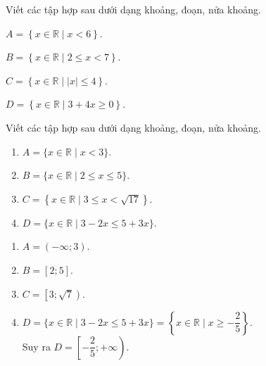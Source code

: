 \begin{bt}[1,0 điểm]%
	Viết các tập hợp sau dưới dạng khoảng, đoạn, nửa khoảng.
	\begin{listEX}[2]
		\item $A = \left\lbrace x \in \mathbb{R} \mid x < 6\right\rbrace$.
		\item $B = \left\lbrace x \in \mathbb{R}\mid 2 \leq x < 7\right\rbrace$.
		\item $C = \left\lbrace x \in \mathbb{R} \mid |x| \leq 4\right\rbrace$.
		\item $D = \left\lbrace x \in \mathbb{R} \mid 3 + 4x \geq 0 \right\rbrace$.
	\end{listEX}
	\loigiai{
		\begin{enumerate}
			\item $A = \left\lbrace x \in \mathbb{R} \mid x < 6\right\rbrace = (-\infty;6)$.
			\item $B = \left\lbrace x \in \mathbb{R}\mid 2 \leq x < 7\right\rbrace = [2;7)$.
			\item Ta có $|x| \leq 4 \Rightarrow -4 \leq x \leq 4$\\
			$\Rightarrow C = \left\lbrace x \in \mathbb{R} \mid |x| \leq 4\right\rbrace = [-4;4]$.
			\item Ta có $3 + 4x \geq 0 \Rightarrow x \geq -\dfrac{3}{4}$\\
			$\Rightarrow D = \left\lbrace x \in \mathbb{R} \mid 3 + 4x \geq 0 \right\rbrace = \left[-\dfrac{3}{4};+\infty\right)$.
		\end{enumerate}
	}
\end{bt}

\begin{bt}%
    Viết các tập hợp sau dưới dạng khoảng, đoạn, nửa khoảng.
    \begin{enumerate}
        \item $A=\{x \in \mathbb{R} \mid x<3\}$.
        \item $B=\{x \in \mathbb{R} \mid 2 \leq x \leq 5\}$.
        \item $C=\left\{x \in \mathbb{R} \mid 3 \leq x<\sqrt{17}\right\}$.
        \item $D=\{x \in \mathbb{R} \mid 3-2 x \leq 5+3 x\}$.
    \end{enumerate}
    \loigiai
    {
          \begin{enumerate}
            \item $A=(-\infty;3)$.
            \item $B=[2;5]$.
            \item $C=\left[3;\sqrt{7}\right)$.
            \item $D=\{x \in \mathbb{R} \mid 3-2 x \leq 5+3 x\}=\left\{x \in \mathbb{R} \mid x \geq - \dfrac{2}{5}\right\}$.\\
            Suy ra $D=\left[-\dfrac{2}{5};+\infty\right)$.
        \end{enumerate}
    }
\end{bt}

